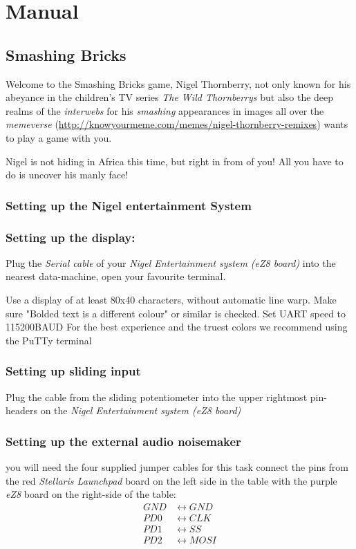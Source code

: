\section{Manual}

\subsection{Smashing Bricks}
Welcome to the Smashing Bricks game,
Nigel Thornberry, not only known for his abeyance in the children's TV series
\emph{The Wild Thornberrys} but also the deep realms of the \emph{interwebs} for
his \emph{smashing} appearances in images all over the \emph{memeverse}
(\url{http://knowyourmeme.com/memes/nigel-thornberry-remixes}) wants to play a game with you.

Nigel is not hiding in Africa this time, but right in from of you! All you have
to do is uncover his manly face!

\subsubsection{Setting up the Nigel entertainment System}

\subsubsection{Setting up the display:}
Plug the \emph{Serial cable} of your \emph{Nigel Entertainment system (eZ8
board)} into the nearest data-machine, open your favourite terminal.

Use a display of at least 80x40 characters, without automatic line warp.
Make sure "Bolded text is a different colour" or similar is checked.
Set UART speed to 115200BAUD
For the best experience and the truest colors we recommend using the PuTTy terminal

\subsubsection{Setting up sliding input}
Plug the cable from the sliding potentiometer into the upper rightmost
pin-headers on the \emph{Nigel Entertainment system (eZ8
board)}

\subsubsection{Setting up the external audio noisemaker}
you will need the four supplied jumper cables for this task connect the pins
from the red \emph{Stellaris Launchpad} board on the left side in the table
with the purple \emph{eZ8} board on the right-side of the table:
\begin{align*}
GND &\leftrightarrow GND\\
PD0 &\leftrightarrow CLK\\
PD1 &\leftrightarrow SS\\
PD2 &\leftrightarrow MOSI
\end{align*}

